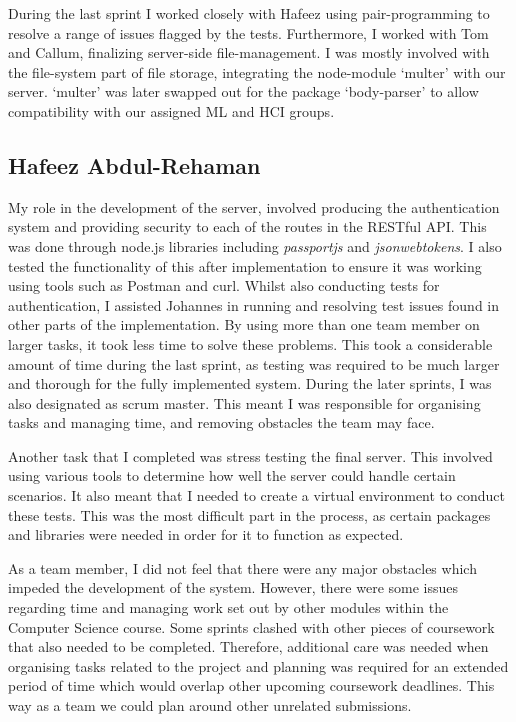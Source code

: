 During the last sprint I worked closely with Hafeez using pair-programming to resolve a range of issues flagged by the tests. Furthermore, I worked with Tom and Callum, finalizing server-side file-management. I was mostly involved with the file-system part of file storage, integrating the node-module `multer' with our server. `multer' was later swapped out for the package `body-parser' to allow compatibility with our assigned ML and HCI groups.
\subsection{Hafeez Abdul-Rehaman}
My role in the development of the server, involved producing the authentication system and providing security to each of the routes in the RESTful API. This was done through node.js libraries including \textit{passportjs} and \textit{jsonwebtokens}. I also tested the functionality of this after implementation to ensure it was working using tools such as Postman and curl. Whilst also conducting tests for authentication, I assisted Johannes in running and resolving test issues found in other parts of the implementation. By using more than one team member on larger tasks, it took less time to solve these problems. This took a considerable amount of time during the last sprint, as testing was required to be much larger and thorough for the fully implemented system. During the later sprints, I was also designated as scrum master. This meant I was responsible for organising tasks and managing time, and removing obstacles the team may face. 

Another task that I completed was stress testing the final server. This involved using various tools to determine how well the server could handle certain scenarios. It also meant that I needed to create a virtual environment to conduct these tests. This was the most difficult part in the process, as certain packages and libraries were needed in order for it to function as expected. 

As a team member, I did not feel that there were any major obstacles which impeded the development of the system. However, there were some issues regarding time and managing work set out by other modules within the Computer Science course. Some sprints clashed with other pieces of coursework that also needed to be completed. Therefore, additional care was needed when organising tasks related to the project and planning was required for an extended period of time which would overlap other upcoming coursework deadlines. This way as a team we could plan around other unrelated submissions.